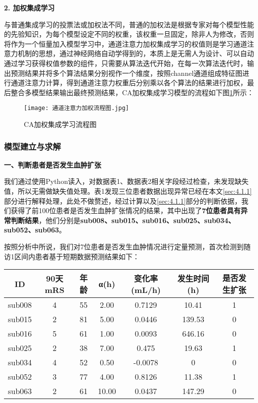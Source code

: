\documentclass[bwprint]{gmcmthesis}
\begin{document}
				\textbf{2. 加权集成学习}
				
				与普通集成学习的投票法或加权法不同，普通的加权法是根据专家对每个模型性能的先验知识，为每个模型设定不同的权重，该权重一旦固定，除非人为修改，否则将作为一个恒量加入模型学习中，通道注意力加权集成学习的权值则是学习通道注意力机制的思想，通过神经网络自动学得到的，本质上是无需人为设计、可以自动通过学习获得权值参数的组件，只需要从算法迭代开始，在每一次算法迭代时，输出预测结果并将多个算法结果分别视作一个维度，按照channel通道组成特征图进行通道注意力计算，得到通道注意力权重后分别乘以各个算法的结果进行加权，最后整合多模型结果输出最终预测结果，CA加权集成学习模型的流程如下图\ref{fig:5}所示：
				
				\begin{figure}[H]
					\centering
					\texttt{[image: 通道注意力加权流程图.jpg]}
					\caption{CA加权集成学习流程图}
					\label{fig:5}
				\end{figure}
				
				
			\subsubsection{模型建立与求解}
				\textbf{一、判断患者是否发生血肿扩张}
				
				我们通过使用Python读入，对数据表1、数据表2相关字段经过检查，未发现缺失值，所以无需做缺失值处理。表1发现三位患者数据出现异常已经在本文\ref{sec:4.1.1}部分进行解释处理，此处不做赘述，经过计算以及\ref{sec:4.1.1}部分的判断依据，我们获得了前100位患者是否发生血肿扩张情况的结果，其中出现了\textbf{7位患者具有异常判断结果}，他们分别是\textbf{sub008、sub015、sub016、sub025、sub034、sub052、sub063}。
				
				按照分析中所说，我们对7位患者是否发生血肿情况进行定量预测，首次检测到随访1区间内患者基于短期数据预测结果如下：
				
				\begin{table}[H]
					\centering
					\begin{tabular}{|c|c|c|c|c|c|c|}
						\hline
						\rowcolor{green!30} ID & 90天mRS & 年龄 & α(h) & 变化率(mL/h) & 发生时间(h) & 是否发生扩张 \\ \hline
						\rowcolor{green!5}sub008 & 4  & 55  & 2.00  & 0.7129 & 10.41 & 1 \\ \hline
						\rowcolor{white!5}sub015 & 2  & 81  & 5.00  & 0.0446 & 139.53 & 0 \\ \hline
						\rowcolor{green!5}sub016 & 5  & 61  & 1.00  & 0.0093 & 646.16 & 0 \\ \hline
						\rowcolor{white!5}sub025 & 2  & 38  & 7.00  & 0.475 & 19.63 & 1 \\ \hline
						\rowcolor{green!5}sub034 & 4  & 52  & 0.50  & -0.0078 & 0 & 0 \\ \hline
						\rowcolor{white!5}sub052 & 3  & 77  & 4.00  & 0.8126 & 11.38 & 1 \\ \hline
						\rowcolor{green!5}sub063 & 2  & 61  & 10.00  & 0.0437 & 147.29 & 0 \\ \hline
					\end{tabular}
				\end{table}
				
\end{document}
